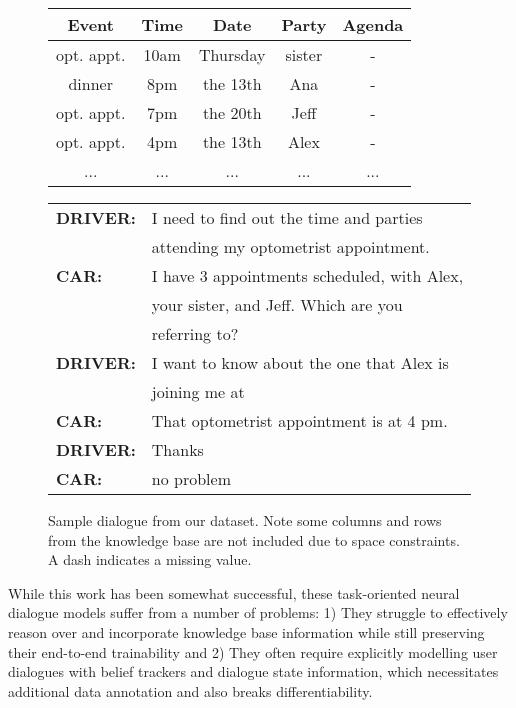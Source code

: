\documentclass[11pt,a4paper]{article}
\begin{document}
\begin{figure}[ht]
\small
\centering
  \begin{tabular}{|c|c|c|c|c|}
  \hline
  \bf Event & \bf Time & \bf Date & \bf Party & \bf Agenda \\ \hline
  opt. appt. & 10am & Thursday & sister & - \\ 
  dinner & 8pm & the 13th & Ana & - \\
  opt. appt. & 7pm & the 20th & Jeff & - \\ 
  opt. appt. & 4pm & the 13th & Alex & - \\ 
  ... & ... & ... & ... & ... \\
  \hline
  \end{tabular}

  \vspace{3mm}

  \newcommand\D{\emph{D}}

  \begin{tabular}{ll}
    \bf DRIVER: & I need to find out the time and parties \\
    & attending my optometrist appointment.\\
    \bf CAR: & I have 3 appointments scheduled, with Alex, \\
    & your sister, and Jeff. Which are you \\
    & referring to? \\
    \bf DRIVER: & I want to know about the one that Alex is \\ 
    & joining me at \\
    \bf CAR: & That optometrist appointment is at 4 pm.\\
    \bf DRIVER: & Thanks\\
    \bf CAR: & no problem \\
  \end{tabular}

  \caption{Sample dialogue from our dataset. Note some columns and rows from the knowledge base are not included due to space constraints. A dash indicates a missing value.}
\end{figure}

  While this work has been somewhat successful, these task-oriented neural dialogue models suffer from a number of problems: 1) They struggle to effectively reason over and incorporate knowledge base information while still preserving their end-to-end trainability and 2) They often require explicitly modelling user dialogues with belief trackers and dialogue state information, which necessitates additional data annotation and also breaks differentiability. 
\end{document}
